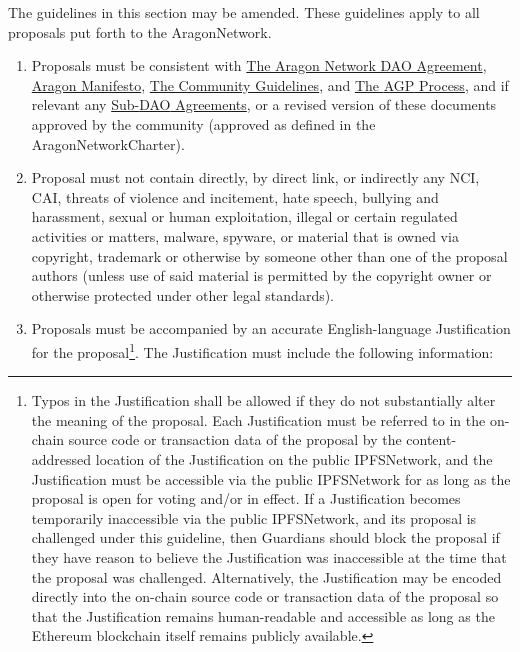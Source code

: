 \begin{enumerate}
	The guidelines in this section may be amended. These guidelines apply to all proposals put forth to the \gls{AragonNetwork}.
	\begin{enumerate}
		\begin{enumerate}
			\item Proposals must be consistent with  
			\hyperref[chap:ANDAOAgreement]{The Aragon Network DAO Agreement}, 
			\hyperref[chap:AragonManifesto]{Aragon Manifesto}, 
			\hyperref[chap:CommunityGuidelines]{The Community Guidelines}, and 
			\hyperref[chap:AGPProcess]{The \ac{AGP} Process}, and if relevant any 
			\hyperref[chap:SubDAOAgreements]{Sub-\ac{DAO} Agreements}, 
			or a revised version of these documents approved by the community (approved as defined in the \gls{AragonNetworkCharter}).
			\item Proposal must not contain directly, by direct link, or indirectly any \ac{NCI}, \ac{CAI}, threats of violence and incitement, hate speech, bullying and harassment, sexual or human exploitation, illegal or certain regulated activities or matters, malware, spyware, or material that is owned via copyright, trademark or otherwise by someone other than one of the proposal authors (unless use of said material is permitted by the copyright owner or otherwise protected under other legal standards).
			\item Proposals must be accompanied by an accurate English-language
			Justification for the proposal\footnote[1]{
				Typos in the Justification shall be allowed if they do not substantially alter the meaning of the proposal. 
				Each Justification must be referred to in the on-chain source code or transaction data of the proposal by the content-addressed location of the Justification on the public \gls{IPFSNetwork}, and the Justification must be accessible via the public \gls{IPFSNetwork} for as long as the proposal is open for voting and/or in effect. 
				If a Justification becomes temporarily inaccessible via the public \gls{IPFSNetwork}, and its proposal is challenged under this guideline, then \glspl{Guardian} should block the proposal if they have reason to believe the Justification was inaccessible at the time that the proposal was challenged. 
				Alternatively, the Justification may be encoded directly into the on-chain source code or transaction data of the proposal so that the Justification remains human-readable and accessible as long as the Ethereum blockchain itself remains publicly available.
			}. 
			The Justification must include the following information:
			

\end{enumerate}
\end{enumerate}
\end{enumerate}

